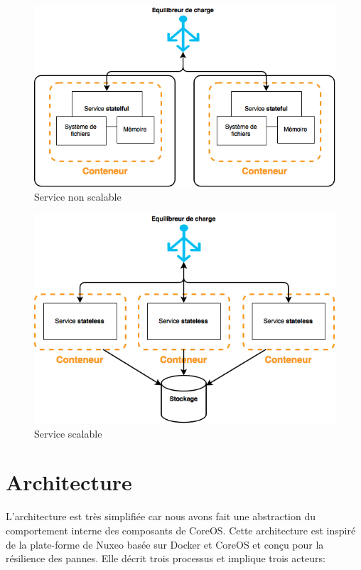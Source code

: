 \begin{onehalfspace}
\begin{figure}[H]
\centering
\includegraphics [scale=0.5]{chapitre4/assets/stateful}
\caption{Service non scalable}
\label{fig:non-scalable}
\end{figure}

\begin{figure}[H]
\centering
\includegraphics [scale=0.5]{chapitre4/assets/stateless}
\caption{Service scalable}
\label{fig:scalable}
\end{figure}


\section{Architecture}



L'architecture est très simplifiée car nous avons fait une abstraction du comportement interne des composants de CoreOS. Cette architecture est inspiré de la plate-forme de Nuxeo \cite{nuxeo} basée sur Docker et CoreOS et conçu pour la résilience des pannes. Elle décrit trois processus et implique trois acteurs:



\end{onehalfspace}
